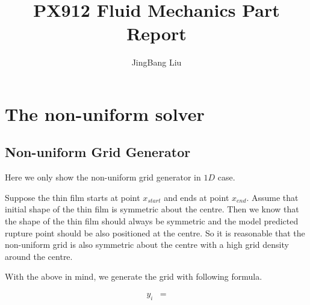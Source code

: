\documentclass[]{article}
\title{PX912 Fluid Mechanics Part Report}
\author{JingBang Liu}
\begin{document}
\maketitle

\section{The non-uniform solver}

\subsection{Non-uniform Grid Generator}

Here we only show the non-uniform grid generator in $1D$ case.

Suppose the thin film starts at point $x_{start}$ and ends at point $x_{end}$. Assume that initial shape of the thin film is symmetric about the centre. Then we know that the shape of the thin film should always be symmetric and the model predicted rupture point should be also positioned at the centre. So it is reasonable that the non-uniform grid is also symmetric about the centre with a high grid density around the centre.

With the above in mind, we generate the grid with following formula.

\begin{align}
	y_i &= 
\end{align}
\end{document}
